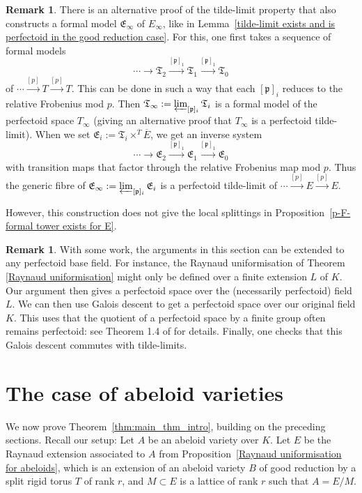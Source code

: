 \documentclass[10pt,oneside]{amsart}
\theoremstyle{definition}
\newtheorem{remark}[theorem]{Remark}
\begin{document}
	\begin{remark}
		There is an alternative proof of the tilde-limit property that also constructs a formal model $\mathfrak E_\infty$ of $E_\infty$, like in Lemma~\ref{tilde-limit exists and is perfectoid in the good reduction case}. For this, one first takes a sequence of formal models 
		\[\cdots \to \mathfrak T_{2}\xrightarrow{[\mathfrak p]_1}\mathfrak T_1\xrightarrow{[\mathfrak p]_1} \mathfrak T_0\]
		of $\cdots\xrightarrow{[p]} T\xrightarrow{[p]} T$. This can be done in such a way that each $[\mathfrak p]_i$ reduces to the relative Frobenius mod $p$. Then $\mathfrak T_\infty:=\varprojlim_{[\mathfrak p]_i}\mathfrak T_i$ is a formal model of the perfectoid space $T_\infty$ (giving an alternative proof that $T_\infty$ is a perfectoid tilde-limit). When we set $\mathfrak E_i:=\mathfrak T_i\times^{\overline{T}}\overline{E}$, we get an inverse system
		\[\cdots \to \mathfrak E_{2}\xrightarrow{[\mathfrak p]_1}\mathfrak E_1\xrightarrow{[\mathfrak p]_1} \mathfrak E_0\]
		with transition maps that factor through the relative Frobenius map mod $p$. Thus the generic fibre of $\mathfrak E_\infty:=\varprojlim_{[\mathfrak p]_i}\mathfrak E_i$ is a perfectoid tilde-limit of $\cdots \xrightarrow{[p]}E\xrightarrow{[p]}E$.
		
		However, this construction does not give the local splittings in Proposition~\ref{p-F-formal tower exists for E}.
	\end{remark}
	
	\begin{remark}\label{general fields for E}
	With some work, the arguments in this section can be extended to any perfectoid base field. For instance, the Raynaud uniformisation of Theorem \ref{Raynaud uniformisation} might only be defined over a finite extension $L$ of $K$. Our argument then gives a perfectoid space over the (necessarily perfectoid) field $L$. We can then use Galois descent to get a perfectoid space over our original field $K$. This uses that the quotient of a perfectoid space by a finite group often remains perfectoid: see Theorem 1.4 of \cite{Hansen_quotients} for details. Finally, one checks that this Galois descent commutes with tilde-limits. 
	\end{remark}

	
	\section{The case of abeloid varieties}\label{The case of abeloid varieties}
	We now prove Theorem~\ref{thm:main_thm_intro}, building on the preceding sections. Recall our setup: Let $A$ be an abeloid variety over $K$. Let $E$ be the Raynaud extension associated to $A$ from Proposition~\ref{Raynaud uniformisation for abeloids}, which is an extension of an abeloid variety $B$ of good reduction by a split rigid torus $T$ of rank $r$, and $M\subset E$  is a lattice of rank $r$ such that $A=E/M$. 
\end{document}
